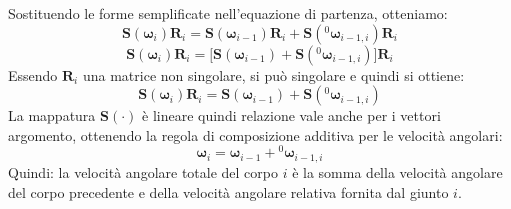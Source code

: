﻿\documentclass[11pt, a4paper]{article}
\begin{document}
Sostituendo le forme semplificate nell'equazione di partenza, otteniamo:
\[
    \bm{S}(\bm{\omega}_i)\bm{R}_i = \bm{S}(\bm{\omega}_{i-1})\bm{R}_i + \bm{S}({}^{0}\bm{\omega}_{i-1,i})\bm{R}_i
\]
\[
    \bm{S}(\bm{\omega}_i)\bm{R}_i = \biggl[\bm{S}(\bm{\omega}_{i-1}) + \bm{S}({}^{0}\bm{\omega}_{i-1,i})\biggl]\bm{R}_i
\]
Essendo \(\bm{R}_i\) una matrice non singolare, si può singolare e quindi si ottiene:
\[
    \bm{S}(\bm{\omega}_i)\bm{R}_i = \bm{S}(\bm{\omega}_{i-1}) + \bm{S}({}^{0}\bm{\omega}_{i-1,i})
\]
La mappatura \(\bm{S}(\cdot)\) è lineare quindi relazione vale anche per i vettori argomento, ottenendo la regola di composizione additiva per le velocità angolari:
\[
    \bm{\omega}_i = \bm{\omega}_{i-1} + {}^{0}\bm{\omega}_{i-1,i}
\]
Quindi: la velocità angolare totale del corpo \(i\) è la somma della velocità angolare del corpo precedente e della velocità angolare relativa fornita dal giunto \(i\).
\end{document}
